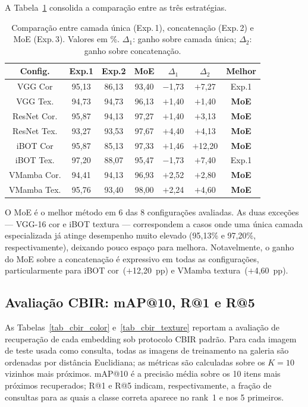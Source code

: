 \documentclass[conference]{IEEEtran}
\begin{document}
A Tabela~\ref{tab_comparacao} consolida a comparação entre as três
estratégias.

\begin{table}[htbp]
\caption{Comparação entre camada única (Exp.\,1), concatenação (Exp.\,2)
         e MoE (Exp.\,3). Valores em \%. $\Delta_1$: ganho sobre camada
         única; $\Delta_2$: ganho sobre concatenação.}
\begin{center}
\begin{tabular}{c|c|c|c|c|c|c}
\hline
\textbf{Config.} & \textbf{Exp.1} & \textbf{Exp.2}
                 & \textbf{MoE} & \textbf{$\Delta_1$}
                 & \textbf{$\Delta_2$} & \textbf{Melhor} \\
\hline
VGG Cor     & 95,13 & 86,13 & 93,40 & $-$1,73 & $+$7,27  & Exp.1 \\
VGG Tex.    & 94,73 & 94,73 & 96,13 & $+$1,40 & $+$1,40  & \textbf{MoE} \\
ResNet Cor. & 95,87 & 94,13 & 97,27 & $+$1,40 & $+$3,13  & \textbf{MoE} \\
ResNet Tex. & 93,27 & 93,53 & 97,67 & $+$4,40 & $+$4,13  & \textbf{MoE} \\
iBOT Cor    & 95,87 & 85,13 & 97,33 & $+$1,46 & $+$12,20 & \textbf{MoE} \\
iBOT Tex.   & 97,20 & 88,07 & 95,47 & $-$1,73 & $+$7,40  & Exp.1 \\
VMamba Cor. & 94,41 & 94,13 & 96,93 & $+$2,52 & $+$2,80  & \textbf{MoE} \\
VMamba Tex. & 95,76 & 93,40 & 98,00 & $+$2,24 & $+$4,60  & \textbf{MoE} \\
\hline
\end{tabular}
\label{tab_comparacao}
\end{center}
\end{table}

O MoE é o melhor método em 6 das 8 configurações avaliadas.
As duas exceções — VGG-16 cor e iBOT textura — correspondem a casos onde
uma única camada especializada já atinge desempenho muito elevado
(95,13\% e 97,20\%, respectivamente), deixando pouco espaço para melhora.
Notavelmente, o ganho do MoE sobre a concatenação é expressivo em todas
as configurações, particularmente para iBOT cor~($+$12,20~pp) e
VMamba textura~($+$4,60~pp).

\subsection{Avaliação CBIR: mAP@10, R@1 e R@5}

As Tabelas~\ref{tab_cbir_color} e~\ref{tab_cbir_texture} reportam a
avaliação de recuperação de cada embedding sob protocolo CBIR padrão.
Para cada imagem de teste usada como consulta, todas as imagens de
treinamento na galeria são ordenadas por distância Euclidiana; as métricas
são calculadas sobre os $K\!=\!10$ vizinhos mais próximos.
mAP@10 é a precisão média sobre os 10 itens mais próximos recuperados;
R@1 e R@5 indicam, respectivamente, a fração de consultas para as quais
a classe correta aparece no rank~1 e nos 5 primeiros.
\end{document}
